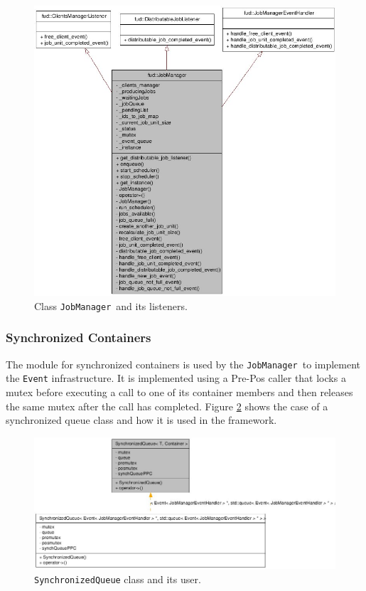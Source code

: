 \documentclass[a4paper,12pt,english]{report}
\newcommand{\JM}{\texttt{JobManager}}
\begin{document}
\begin{figure}[!ht]
\begin{center}
\includegraphics [bb= 0 0 388 373]{images/JM.jpg}
\end{center}
\caption{Class \JM \ and its listeners.}
\label{JM}
\end{figure}

\subsubsection{Synchronized Containers}

The module for synchronized containers is used by the \JM \ to implement the \texttt{Event} infrastructure. It is implemented using a Pre-Pos caller that locks a mutex before executing a call to one of its container members and then releases the same mutex after the call has completed. Figure \ref{SQ} shows the case of a synchronized queue class and how it is used in the framework.

\begin{figure}[!ht]
\begin{center}
\includegraphics [bb= 0 0 361 158]{images/SQ.jpg}
\end{center}
\caption{\texttt{SynchronizedQueue} class and its user.}
\label{SQ}
\end{figure}
\end{document}
